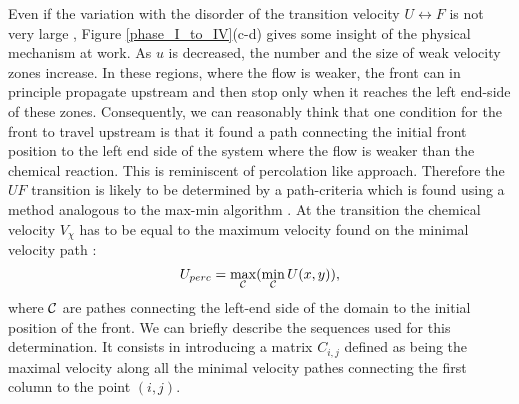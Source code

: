 \documentclass[doublecol]{epl2}
\begin{document}
Even if the variation with the disorder of the transition velocity $U\leftrightarrow F$ is not very large ,
Figure \ref{phase_I_to_IV}(c-d) gives some insight of the physical mechanism at work. As $u$ is decreased, the number and the size of weak velocity zones increase. In these regions, where the flow is weaker, the front can in principle propagate upstream and then stop only when it reaches the left end-side of these zones. Consequently, we can reasonably think that one condition for the front to travel upstream is that it found a path connecting the initial front position to the left end side of the system where the flow is weaker than the chemical reaction. This is reminiscent of percolation like approach. Therefore the  $UF$ transition is likely to be determined by a path-criteria which is found using  a method analogous to the max-min algorithm \cite{hansen87}. At the transition the chemical velocity $V_{\chi }$ has to be equal to the maximum velocity found on the minimal velocity path :
$$U_{perc} = \max_{\cal C} (\min_{\cal C} U(x,y)),$$
 where $\cal C$ are pathes connecting the left-end side of the domain to the initial position of the front.
We can briefly describe the sequences used for this determination. It consists in introducing a matrix $C_{i,j}$ defined as being the maximal velocity along all the minimal velocity pathes connecting the first column to the point $(i,j)$.
\end{document}
